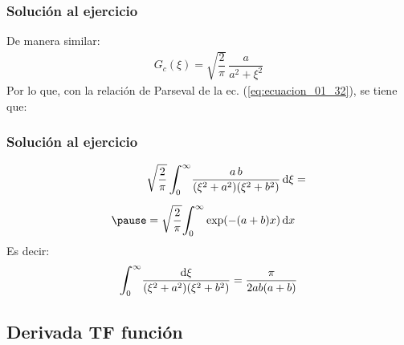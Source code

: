 \begin{frame}
\frametitle{Solución al ejercicio}
De manera similar:
\pause
\begin{align*}
G_{c} (\xi) = \sqrt{\dfrac{2}{\pi}} \, \dfrac{a}{a^{2} + \xi^{2}}
\end{align*}
\pause
Por lo que, con la relación de Parseval de la ec. (\ref{eq:ecuacion_01_32}), se tiene que:
\end{frame}
\begin{frame}
\frametitle{Solución al ejercicio}
\begin{eqnarray*}
\begin{aligned}
&\sqrt{\dfrac{2}{\pi}} \, \scaleint{6ex}_{\bs 0}^{\infty} \dfrac{a \, b}{(\xi^{2} + a^{2})(\xi^{2} + b^{2})} \dd{\xi} = \\[0.5em] \pause
&=\sqrt{\dfrac{2}{\pi}} \scaleint{6ex}_{\bs 0}^{\infty} \exp(-(a + b) x) \dd{x}
\end{aligned}
\end{eqnarray*}
\pause  
Es decir:
\pause
\begin{align*}
\scaleint{6ex}_{\bs 0}^{\infty} \dfrac{\dd{\xi}}{(\xi^{2} + a^{2})(\xi^{2} + b^{2})} = \dfrac{\pi}{2 a b (a + b)}
\end{align*}
\end{frame}

\subsection{Derivada TF función}

